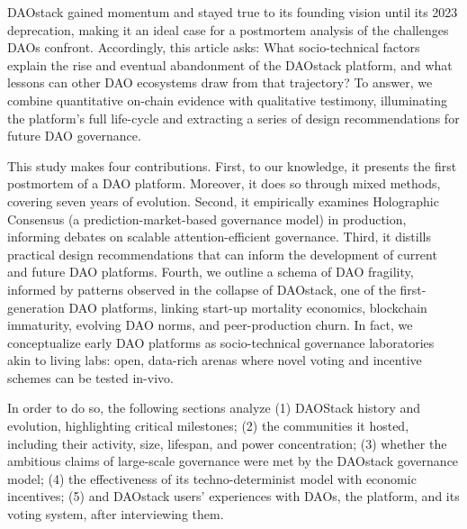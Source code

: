 \documentclass[10pt,lineno]{wlpeerj}
\begin{document}
DAOstack gained momentum and stayed true to its founding vision until its 2023 deprecation, making it an ideal case for a postmortem analysis of the challenges DAOs confront. Accordingly, this article asks: What socio-technical factors explain the rise and eventual abandonment of the DAOstack platform, and what lessons can other DAO ecosystems draw from that trajectory? To answer, we combine quantitative on-chain evidence with qualitative testimony, illuminating the platform’s full life-cycle and extracting a series of design recommendations for future DAO governance. 

This study makes four contributions. First, to our knowledge, it presents the first postmortem of a DAO platform. Moreover, it does so through mixed methods, covering seven years of evolution. 
Second, it empirically examines Holographic Consensus (a prediction-market-based governance model) in production, informing debates on scalable attention-efficient governance. Third, it distills practical design recommendations that can inform the development of current and future DAO platforms.
Fourth, we outline a schema of DAO fragility, informed by patterns observed in the collapse of DAOstack, one of the first-generation DAO platforms, linking start-up mortality economics, blockchain immaturity, evolving DAO norms, and peer-production churn. In fact, we conceptualize early DAO platforms as socio-technical governance laboratories akin to living labs: open, data-rich arenas where novel voting and incentive schemes can be tested in-vivo.

In order to do so, the following sections analyze (1) DAOStack history and evolution, highlighting critical milestones; (2) the communities it hosted, including their activity, size, lifespan, and power concentration; (3) whether the ambitious claims of large-scale governance were met by the DAOstack governance model; (4) the effectiveness of its techno-determinist model with economic incentives; (5) and DAOstack users' experiences with DAOs, the platform, and its voting system, after interviewing them. 

 
\end{document}
